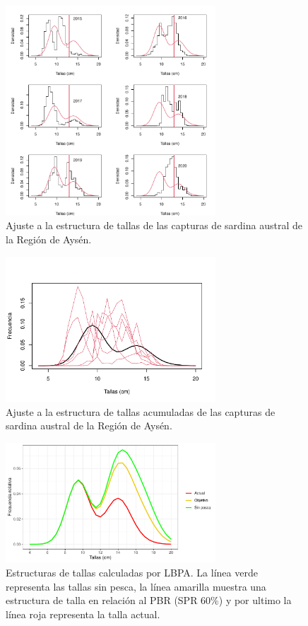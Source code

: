 \documentclass[
  spanish,
]{article}
\begin{document}
\begin{figure}[h!]
\centering
\includegraphics[width=0.7\textwidth]{LBPA/Figuras/ajuste_tallas-1.pdf}
\caption{Ajuste a la estructura de tallas de las capturas de sardina austral de la Región de Aysén.}
\label{Fig21}
\end{figure}

\begin{figure}[h!]
\centering
\includegraphics[width=0.7\textwidth]{LBPA/Figuras/ajusteTallasAcumuladas-1.pdf}
\caption{Ajuste a la estructura de tallas acumuladas de las capturas de sardina austral de la Región de Aysén.}
\label{Fig22}
\end{figure}

\pagebreak

\begin{figure}[h!]
\centering
\includegraphics[width=0.7\textwidth]{LBPA/Figuras/EstatusTallas-1.pdf}
\caption{Estructuras de tallas calculadas por LBPA. La línea verde representa las tallas sin pesca, la línea amarilla muestra una estructura de talla en relación al PBR (SPR 60\%) y por ultimo la línea roja representa la talla actual.}
\label{Fig23}
\end{figure}
\end{document}
